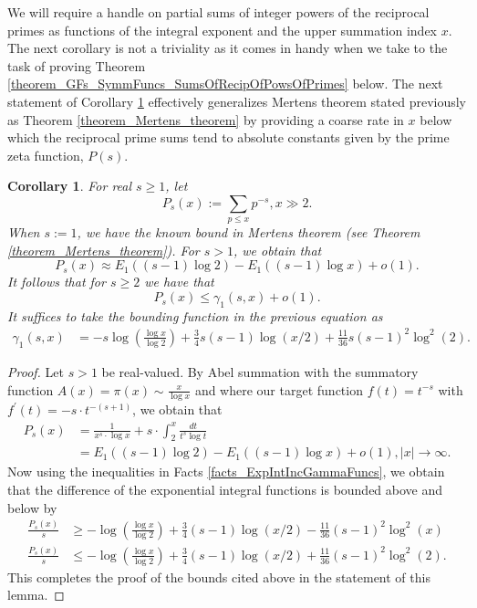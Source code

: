\documentclass[11pt,reqno,a4letter]{article}
\numberwithin{figure}{section}
\numberwithin{table}{section}
\theoremstyle{plain}
\newtheorem{cor}[theorem]{Corollary}
\numberwithin{theorem}{section}
\theoremstyle{definition}
\newcommand{\NBRef}[1]{}
\begin{document}
We will require a handle on partial sums of integer powers of the reciprocal primes as 
functions of the integral exponent and the upper summation index $x$. 
The next corollary is not a triviality as it comes in handy when we take to the task of 
proving Theorem \ref{theorem_GFs_SymmFuncs_SumsOfRecipOfPowsOfPrimes} below. 
The next statement of Corollary \ref{cor_PartialSumsOfReciprocalsOfPrimePowers} 
effectively generalizes Mertens theorem stated previously as Theorem \ref{theorem_Mertens_theorem} 
by providing a coarse rate in $x$ below which the reciprocal prime sums tend to 
absolute constants given by the prime zeta function, $P(s)$. 

\begin{cor} 
\label{cor_PartialSumsOfReciprocalsOfPrimePowers} 
For real $s \geq 1$, let 
\[
P_s(x) := \sum_{p \leq x} p^{-s}, x \gg 2. 
\]
When $s := 1$, we have the known bound in Mertens theorem 
(see Theorem \ref{theorem_Mertens_theorem}). For $s > 1$, we obtain that 
\[
P_s(x) \approx E_1((s-1) \log 2) - E_1((s-1) \log x) + o(1). 
\]
It follows that for $s \geq 2$ we have that 
\[
P_s(x) \leq \gamma_1(s, x) + o(1). 
\]
It suffices to take the bounding function in the previous equation as 
\begin{align*}
\gamma_1(s, x) & = -s\log\left(\frac{\log x}{\log 2}\right) + \frac{3}{4}s(s-1) \log(x/2) + 
     \frac{11}{36} s(s-1)^2 \log^2(2). 
\end{align*}
\end{cor} 
\NBRef{A05-2020-04-26} 
\begin{proof} 
Let $s > 1$ be real-valued. 
By Abel summation with the summatory function $A(x) = \pi(x) \sim \frac{x}{\log x}$ and where 
our target function $f(t) = t^{-s}$ with $f^{\prime}(t) = -s \cdot t^{-(s+1)}$, we obtain that 
\begin{align*} 
P_s(x) & = \frac{1}{x^s \cdot \log x} + s \cdot \int_2^{x} \frac{dt}{t^s \log t} \\ 
     & = E_1((s-1) \log 2) - E_1((s-1) \log x) + o(1), |x| \rightarrow \infty. 
\end{align*} 
Now using the inequalities in Facts \ref{facts_ExpIntIncGammaFuncs}, we obtain that the 
difference of the exponential integral functions is bounded above and below by 
\begin{align*} 
\frac{P_s(x)}{s} & \geq -\log\left(\frac{\log x}{\log 2}\right) + \frac{3}{4}(s-1) \log(x/2) - 
     \frac{11}{36} (s-1)^2 \log^2(x) \\ 
\frac{P_s(x)}{s} & \leq -\log\left(\frac{\log x}{\log 2}\right) + \frac{3}{4}(s-1) \log(x/2) + 
     \frac{11}{36} (s-1)^2 \log^2(2). 
\end{align*} 
This completes the proof of the bounds cited above in the statement of this lemma. 
\end{proof} 
\end{document}
